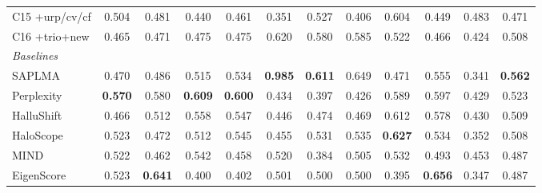 \begin{table}[h]
\begin{tabular}{lcccccccccc|c}
C15 {+}urp/cv/cf & 0.504 & 0.481 & 0.440 & 0.461 & 0.351 & 0.527 & 0.406 & 0.604 & 0.449 & 0.483 & 0.471 \\
C16 {+}trio{+}new & 0.465 & 0.471 & 0.475 & 0.475 & 0.620 & 0.580 & 0.585 & 0.522 & 0.466 & 0.424 & 0.508 \\
\midrule
\multicolumn{12}{l}{\emph{Baselines}}\\
SAPLMA & 0.470 & 0.486 & 0.515 & 0.534 & \textbf{0.985} & \textbf{0.611} & 0.649 & 0.471 & 0.555 & 0.341 & \textbf{0.562} \\
Perplexity & \textbf{0.570} & 0.580 & \textbf{0.609} & \textbf{0.600} & 0.434 & 0.397 & 0.426 & 0.589 & 0.597 & 0.429 & 0.523 \\
HalluShift & 0.466 & 0.512 & 0.558 & 0.547 & 0.446 & 0.474 & 0.469 & 0.612 & 0.578 & 0.430 & 0.509 \\
HaloScope & 0.523 & 0.472 & 0.512 & 0.545 & 0.455 & 0.531 & 0.535 & \textbf{0.627} & 0.534 & 0.352 & 0.508 \\
MIND & 0.522 & 0.462 & 0.542 & 0.458 & 0.520 & 0.384 & 0.505 & 0.532 & 0.493 & 0.453 & 0.487 \\
EigenScore & 0.523 & \textbf{0.641} & 0.400 & 0.402 & 0.501 & 0.500 & 0.500 & 0.395 & \textbf{0.656} & 0.347 & 0.487 \\
\bottomrule
\end{tabular}
\end{table}